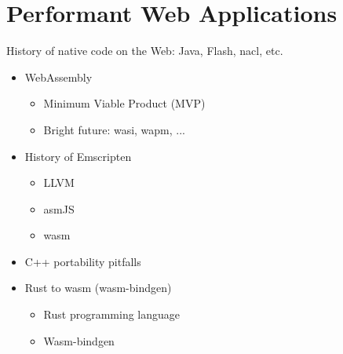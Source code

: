 \chapter{Performant Web Applications}%
\label{cha:performant_web_applications}

History of native code on the Web: Java, Flash, nacl, etc.

\begin{itemize}
	\item WebAssembly
	\begin{itemize}
		\item Minimum Viable Product (MVP)
		\item Bright future: wasi, wapm, ...
	\end{itemize}
	\item History of Emscripten
	\begin{itemize}
		\item LLVM
		\item asmJS
		\item wasm
	\end{itemize}
	\item C++ portability pitfalls
	\item Rust to wasm (wasm-bindgen)
	\begin{itemize}
		\item Rust programming language
		\item Wasm-bindgen
	\end{itemize}
\end{itemize}
